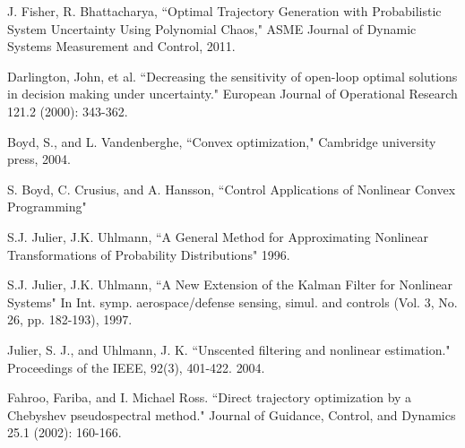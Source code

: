 \documentclass[10pt,a4paper]{article}
\begin{document}
	
	\begin{thebibliography}{1}
	
		
		
		
		J. Fisher, R. Bhattacharya, ``Optimal Trajectory Generation with Probabilistic System Uncertainty Using Polynomial Chaos," ASME Journal of Dynamic Systems Measurement and Control, 2011.
		
		Darlington, John, et al. ``Decreasing the sensitivity of open-loop optimal solutions in decision making under uncertainty." European Journal of Operational Research 121.2 (2000): 343-362.
		
		
		
		Boyd, S., and L. Vandenberghe, ``Convex optimization," Cambridge university press, 2004.
		
		S. Boyd, C. Crusius, and A. Hansson, ``Control Applications of Nonlinear Convex Programming"
		
		
		S.J. Julier, J.K. Uhlmann, ``A General Method for Approximating Nonlinear Transformations of Probability Distributions" 1996.

		S.J. Julier, J.K. Uhlmann, ``A New Extension of the Kalman Filter for Nonlinear Systems" In Int. symp. aerospace/defense sensing, simul. and controls (Vol. 3, No. 26, pp. 182-193), 1997.
		
		Julier, S. J., and Uhlmann, J. K. ``Unscented filtering and nonlinear estimation." Proceedings of the IEEE, 92(3), 401-422. 2004.
				
				
		Fahroo, Fariba, and I. Michael Ross. ``Direct trajectory optimization by a Chebyshev pseudospectral method." Journal of Guidance, Control, and Dynamics 25.1 (2002): 160-166.
		

\end{thebibliography}
\end{document}
